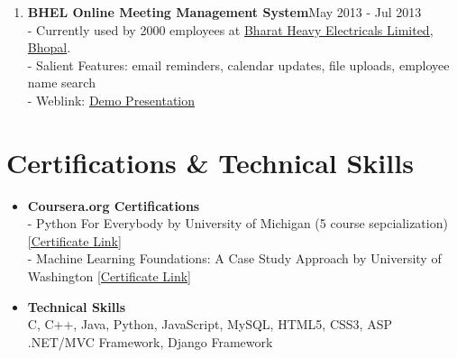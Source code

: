 \documentclass[a4]{article}
\begin{document}
\begin{enumerate}
    \item \textbf{BHEL Online Meeting Management System}{\hfill May 2013 - Jul 2013}\\
    - Currently used by 2000 employees at \href{https://www.bhelbpl.co.in/bplweb_new/}{Bharat Heavy Electricals Limited, Bhopal}.\\
    - Salient Features: email reminders, calendar updates, file uploads, employee name search\\
    - Weblink: \href{https://drive.google.com/file/d/0B4QcfJ1IXQCVczFfTmJTSjdLOGM/view?usp=sharing}{Demo Presentation}
    
\end{enumerate}


\section*{Certifications \& Technical Skills}
\begin{itemize}
    \item \textbf{Coursera.org Certifications}\\
    - Python For Everybody by University of Michigan (5 course sepcialization) \href{https://www.coursera.org/account/accomplishments/specialization/2B5PCJGZ9WEE}{[Certificate Link]}\\
    - Machine Learning Foundations: A Case Study Approach by University of Washington \href{https://www.coursera.org/account/accomplishments/certificate/NDVXWMCYKX9N}{[Certificate Link]}
    
    \item \textbf{Technical Skills}\\
    C, C++, Java, Python, JavaScript, MySQL, HTML5, CSS3, ASP .NET/MVC Framework, Django Framework
\end{itemize}
\end{document}
